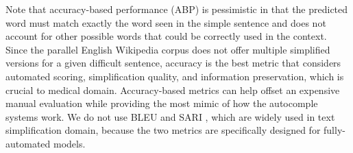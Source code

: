 \documentclass[11pt]{article}
\newcommand{\todo}[1]{\textcolor{red}{TODO: #1}}
\begin{document}
Note that accuracy-based performance (ABP) is pessimistic in that the predicted word must match exactly the word seen in the simple sentence and does not account for other possible words that could be correctly used in the context. Since the parallel English Wikipedia corpus does not offer multiple simplified versions for a given difficult sentence, accuracy is the best metric that considers automated scoring, simplification quality, and information preservation, which is crucial to medical domain. Accuracy-based metrics can help offset an expensive manual evaluation while providing the most mimic of how the autocomple systems work. We do not use BLEU \cite{papineni2002bleu} and SARI \cite{xu2016optimizing}, which are widely used in text simplification domain, because the two metrics are specifically designed for fully-automated models.

\begin{table}
    \centering
    \caption{An example sentence pair from the English Wikipedia corpus.\todo{AHMAD: after you finished Medical Corpora part, please fix this table with a medical example.}}
    \label{tab:testexample}
\end{table}


\begin{table}
\centering
{}
\caption{The resulting prediction tasks that are generated from the example in Table \ref{tab:testexample}. \todo{AHMAD: after you finished Medical Corpora part, please fix this table with a medical example.}}
\label{fig:testing}
\end{table}
\end{document}
